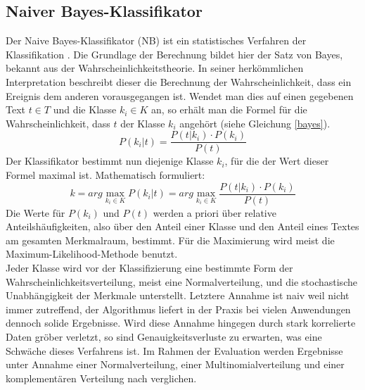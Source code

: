 \subsection{Naiver Bayes-Klassifikator}
Der Naive Bayes-Klassifikator (NB) ist ein statistisches Verfahren der Klassifikation \citep{Rish01}. Die Grundlage der Berechnung bildet hier der Satz von Bayes, bekannt aus der Wahrscheinlichkeitstheorie. In seiner herkömmlichen Interpretation beschreibt dieser die Berechnung der Wahrscheinlichkeit, dass ein Ereignis dem anderen vorausgegangen ist. Wendet man dies auf einen gegebenen Text $t \in T$ und die Klasse $k_i \in K$ an, so erhält man die Formel für die Wahrscheinlichkeit, dass $t$ der Klasse $k_i$ angehört (siehe Gleichung \ref{bayes}).
\begin{equation}
	P(k_i|t) = \frac{P(t|k_i) \cdot P(k_i)}{P(t)}
	\label{bayes}
\end{equation}
Der Klassifikator bestimmt nun diejenige Klasse $k_i$, für die der Wert dieser Formel maximal ist. Mathematisch formuliert:
\begin{equation}
	k = arg \max\limits_{k_i \in K} P(k_i|t) = arg \max\limits_{k_i \in K} \frac{P(t|k_i) \cdot P(k_i)}{P(t)}
\end{equation}
Die Werte für $P(k_i)$ und $P(t)$ werden a priori über relative Anteilshäufigkeiten, also über den Anteil einer Klasse und den Anteil eines Textes am gesamten Merkmalraum, bestimmt. Für die Maximierung wird meist die Maximum-Likelihood-Methode benutzt.\\
Jeder Klasse wird vor der Klassifizierung eine bestimmte Form der Wahrscheinlichkeitsverteilung, meist eine Normalverteilung, und die stochastische Unabhängigkeit der Merkmale unterstellt. Letztere Annahme ist \glqq naiv\grqq{}  weil nicht immer zutreffend, der Algorithmus liefert in der Praxis bei vielen Anwendungen dennoch solide Ergebnisse. Wird diese Annahme hingegen durch stark korrelierte Daten gröber verletzt, so sind Genauigkeitsverluste zu erwarten, was eine Schwäche dieses Verfahrens ist. Im Rahmen der Evaluation werden Ergebnisse unter Annahme einer Normalverteilung, einer Multinomialverteilung und einer komplementären Verteilung nach \citet{rennie03} verglichen.
\pagebreak
